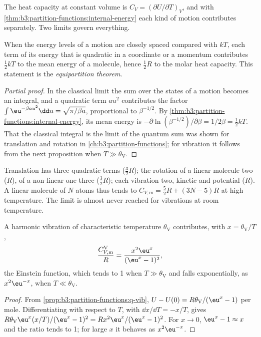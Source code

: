 The heat capacity at constant volume is $C_V = (\partial U/\partial T)_V$, and with
\cref{thm:b3:partition-functions:internal-energy} each kind of motion
contributes separately. Two limits govern everything.

\begin{theorem}\label{thm:b3:statistical-thermo-applied:equipartition}
When the energy levels of a motion are closely spaced compared with $kT$, each
term of its energy that is quadratic in a coordinate or a momentum contributes
$\frac12kT$ to the mean energy of a molecule, hence $\frac12R$ to the molar heat
capacity. This statement is the \emph{equipartition theorem}.
\end{theorem}

\begin{proof}[Partial proof]
In the classical limit the sum over the states of a motion becomes an
integral, and a quadratic term $a u^2$ contributes the factor $\int\eu^{-\beta au^2}\dd u =
\sqrt{\pi/\beta a}$, proportional to $\beta^{-1/2}$. By
\cref{thm:b3:partition-functions:internal-energy}, its mean energy is
$-\partial\ln(\beta^{-1/2})/\partial\beta = 1/2\beta = \frac12kT$. That the classical integral is the
limit of the quantum sum was shown for translation and rotation in
\cref{ch:b3:partition-functions}; for vibration it follows from the next
proposition when $T \gg \theta_{\mathrm V}$.
\end{proof}

Translation has three quadratic terms ($\frac32R$); the rotation of a linear
molecule two ($R$), of a non-linear one three ($\frac32R$); each vibration two,
kinetic and potential ($R$). A linear molecule of $N$ atoms thus tends to
$C_{V,\mathrm m} = \frac52R + (3N - 5)R$ at high temperature. The limit is almost never
reached for vibrations at room temperature.

\begin{proposition}\label{prop:b3:statistical-thermo-applied:cv-vib}
A harmonic vibration of characteristic temperature $\theta_{\mathrm V}$ contributes, with
$x = \theta_{\mathrm V}/T$,
\[
  \frac{C_{V,\mathrm m}^{\mathrm V}}{R} = \frac{x^2\eu^x}{(\eu^x - 1)^2},
\]
the Einstein function, which tends to 1 when $T \gg \theta_{\mathrm V}$ and falls
exponentially, as $x^2\eu^{-x}$, when $T \ll \theta_{\mathrm V}$.
\end{proposition}

\begin{proof}
From \cref{prop:b3:partition-functions:q-vib}, $U - U(0) = R\theta_{\mathrm V}/(\eu^x - 1)$ per mole.
Differentiating with respect to $T$, with $\dd x/\dd T = -x/T$, gives
$R\theta_{\mathrm V}\eu^x(x/T)/(\eu^x - 1)^2 = Rx^2\eu^x/(\eu^x - 1)^2$. For $x \to 0$, $\eu^x - 1 \approx x$ and the
ratio tends to 1; for large $x$ it behaves as $x^2\eu^{-x}$.
\end{proof}

